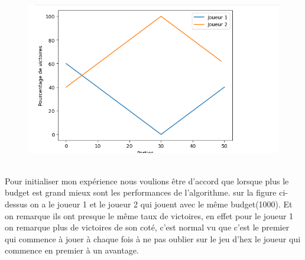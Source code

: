 \documentclass[12pt]{article}
\begin{document}
\begin{figure}[h!]
		\centering
		\includegraphics[width = 1\textwidth]{images/exP2.png}
		\caption{}
		\label{eq1}
\end{figure}
\\
Pour initialiser mon expérience nous voulions être d'accord que lorsque plus le budget est grand mieux sont les performances de  l'algorithme.
sur la figure ci-dessus on a le joueur 1 et le joueur 2 qui jouent avec le même budget(1000).
Et on remarque ils ont presque le  même taux de victoires, en effet pour le joueur 1 on remarque plus de victoires de son coté, c'est normal vu que c'est le premier qui commence à jouer à chaque fois à ne pas oublier sur le jeu d'hex le joueur qui commence en premier à un avantage.
\end{document}
